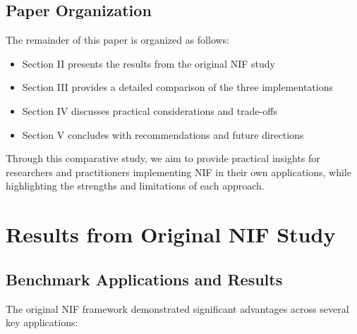 \documentclass[10pt,journal,compsoc,onecolumn]{IEEEtran}
\begin{document}
\subsection{Paper Organization}
The remainder of this paper is organized as follows:

\begin{itemize}
    \item Section II presents the results from the original NIF study
    \item Section III provides a detailed comparison of the three implementations
    \item Section IV discusses practical considerations and trade-offs
    \item Section V concludes with recommendations and future directions
\end{itemize}

Through this comparative study, we aim to provide practical insights for researchers and practitioners implementing NIF in their own applications, while highlighting the strengths and limitations of each approach.

\section{Results from Original NIF Study}
\subsection{Benchmark Applications and Results}
The original NIF framework demonstrated significant advantages across several key applications:
\end{document}
